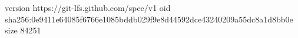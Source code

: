 version https://git-lfs.github.com/spec/v1
oid sha256:0e9411e64085f6766e1085bddb029f9e8d44592dce43240209a55dc8a1d8bb0e
size 84251
